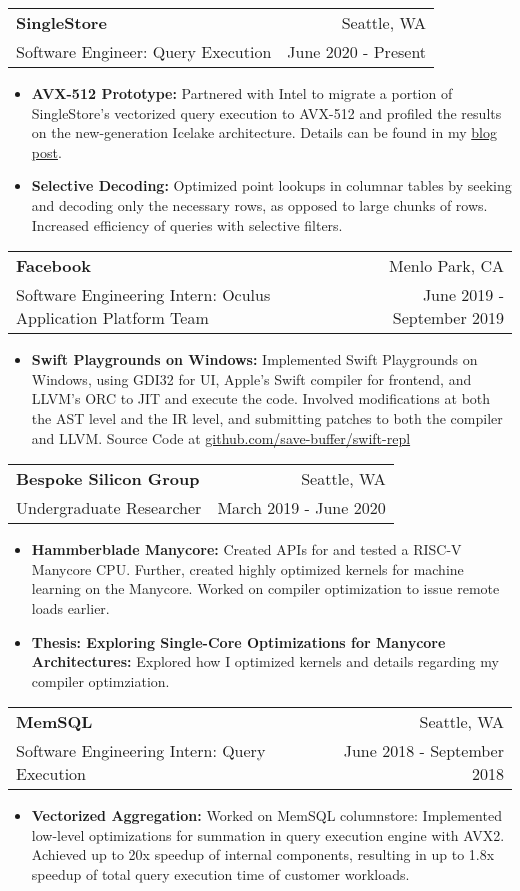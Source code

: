 \documentclass[letterpaper,11pt]{article}
\makeatletter
\newcommand{\resumeItem}[2]{
\item\small{
    \textbf{#1}{\textbf{:} #2 \vspace{-2pt}}
  }
}
\newcommand{\resumeSubheading}[4]{
  \vspace{8pt}
  \begin{tabular*}{0.97\textwidth}{l@{\extracolsep{\fill}}r}
    \textbf{#1} & #2 \\
    {\small#3} & {\small #4} \\
  \end{tabular*}\vspace{-5pt}
}
\newcommand{\resumeItemListStart}{\begin{itemize}}
\newcommand{\resumeItemListEnd}{\end{itemize}\vspace{-5pt}}
\makeatother
\begin{document}
\vspace{4pt}
\resumeSubheading
{SingleStore}{Seattle, WA}
{Software Engineer: Query Execution}{June 2020 - Present}
\vspace{2pt}
\resumeItemListStart
\resumeItem{AVX-512 Prototype}
{Partnered with Intel to migrate a portion of SingleStore's vectorized query execution to
  AVX-512 and profiled the results on the new-generation Icelake architecture. Details can
  be found in my \href{https://www.singlestore.com/blog/a-programmers-perspective/}{blog post}.}
\resumeItem{Selective Decoding}
{Optimized point lookups in columnar tables by seeking and decoding only the necessary rows,
  as opposed to large chunks of rows. Increased efficiency of queries with selective filters.}
\resumeItemListEnd
\vspace{4pt}
\resumeSubheading
{Facebook}{Menlo Park, CA}
{Software Engineering Intern: Oculus Application Platform Team}{June 2019 - September 2019}
\vspace{2pt}
\resumeItemListStart
\resumeItem{Swift Playgrounds on Windows}
{Implemented Swift Playgrounds on Windows, using GDI32 for UI, Apple's Swift compiler
  for frontend, and LLVM's ORC to JIT and execute the code. Involved modifications
  at both the AST level and the IR level, and submitting patches to both the compiler
  and LLVM. Source Code at \href{https://www.github.com/save-buffer/swift-repl}
  {github.com/save-buffer/swift-repl}}
\resumeItemListEnd
\vspace{4pt}
\resumeSubheading
{Bespoke Silicon Group}{Seattle, WA}
{Undergraduate Researcher}{March 2019 - June 2020}
\resumeItemListStart
\resumeItem{Hammberblade Manycore}
{Created APIs for and tested a RISC-V Manycore CPU. Further, created highly optimized kernels
  for machine learning on the Manycore. Worked on compiler optimization to issue remote
  loads earlier.}
\resumeItem{Thesis: Exploring Single-Core Optimizations for Manycore Architectures}{Explored
  how I optimized kernels and details regarding my compiler optimziation.}
\resumeItemListEnd
\resumeSubheading
{MemSQL}{Seattle, WA}
{Software Engineering Intern: Query Execution}{June 2018 - September 2018}
\vspace{2pt}
\resumeItemListStart
\resumeItem{Vectorized Aggregation}
{Worked on MemSQL columnstore: Implemented low-level optimizations for summation in
  query execution engine with AVX2. Achieved up to 20x speedup of internal components,
  resulting in up to 1.8x speedup of total query execution time of customer workloads.}
\resumeItemListEnd
\vspace{4pt}
\end{document}
